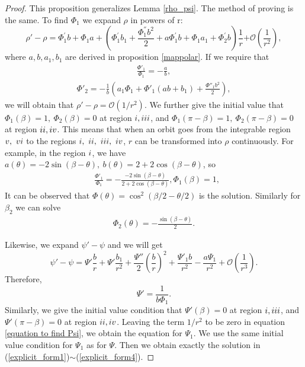 \documentclass{article}
\def \Rone{\uppercase\expandafter{\romannumeral1}}
\def \Rtwo{\uppercase\expandafter{\romannumeral2}}
\def \Rthree{\uppercase\expandafter{\romannumeral3}}
\def \Rfour{\uppercase\expandafter{\romannumeral4}}
\def \Rfive{\uppercase\expandafter{\romannumeral5}}
\def \Rsix{\uppercase\expandafter{\romannumeral6}}
\numberwithin{figure}{section}
\numberwithin{equation}{section}
\theoremstyle{remark}
\theoremstyle{definition}
\begin{document}
\begin{proof}
        This proposition generalizes Lemma \ref{rho_psi}. The method of proving is the same. 
	To find $\Phi_1$ we expand $\rho$ in powers of r:
	$${\rho'} - \rho = \Phi_{1}^{'}b + \Phi_{1}a + \left( \Phi_{1}^{'}b_{1} + \frac{\Phi_{1}^{''}b^{2}}{2} + a\Phi_{1}^{'}b + \Phi_{1}a_{1} + \Phi_{2}^{'}b \right)\frac{1}{r}\mathcal{+ O}\left( \frac{1}{r^{2}} \right),$$
	where $a,b,a_1,b_1$ are derived in proposition \ref*{mappolar}. If we require that
	\begin{align}
		\frac{\Phi'_1}{\Phi_1}=-\frac{a}{b},
	\end{align}
	\begin{align}\label{Phi2}
		\Phi'_2=-\frac{1}{b}\left(a_1\Phi_1+\Phi'_1(ab+b_1)+\frac{\Phi''_1b^2}{2}\right),
	\end{align}
	we will obtain that $\rho'-\rho=\mathcal{O}(1/r^2)$. We further give the initial value that $\Phi_1(\beta)=1,\ \Phi_2(\beta)=0$ at region $\Rone, \Rthree$, and $\Phi_1(\pi-\beta)=1,\ \Phi_2(\pi-\beta)=0$ at region $\Rtwo, \Rfour$. This means that when an orbit goes from the integrable region $\Rfive,\ \Rsix$ to the regions $\Rone,\ \Rtwo,\ \Rthree,\ \Rfour$, $r$ can be transformed into $\rho$ continuously. For example, in the region $\Rone$, we have $a(\theta)=-2\sin(\beta-\theta),\ b(\theta)=2+2\cos(\beta-\theta)$, so
	\begin{align*}
		&\frac{\Phi'_1}{\Phi_1}=-\frac{-2\sin(\beta-\theta)}{2+2\cos(\beta-\theta)}, \Phi_1(\beta)=1,
	\end{align*}
	It can be observed that $\Phi(\theta)=\cos^2\left(\beta/2-\theta/2\right)$ is the solution. Similarly for $\beta_2$ we can solve\begin{align*}
		\Phi_2(\theta)=-\frac{\sin(\beta-\theta)}{2}.
	\end{align*}
	
	Likewise, we expand $\psi'-\psi$ and we will get
    \begin{equation}\label{equation to find Psi}
        \psi'-\psi=\Psi'\frac{b}{r}+\Psi'\frac{b_1}{r^2}+\frac{\Psi''}{2}{\left(\frac{b}{r}\right)}^2+\frac{\Psi'_1b}{r^2}-\frac{a\Psi_1}{r^2}+\mathcal{O}\left(\frac{1}{r^3}\right).
    \end{equation}
        Therefore, 
	$$\Psi'=\frac{1}{b\Phi_1}.$$
	Similarly, we give the initial value condition that $\Psi'(\beta)=0$ at region $\Rone, \Rthree$, and $\Psi'(\pi-\beta)=0$ at region $\Rtwo, \Rfour$. Leaving the term $1/r^2$ to be zero in equation \ref{equation to find Psi}, we obtain the equation for $\Psi_1$. We use the same initial value condition for $\Psi_1$ as for $\Psi$. Then we obtain exactly the solution in (\ref{explicit_form1})$\sim$(\ref{explicit_form4}).
    \end{proof}
\end{document}
